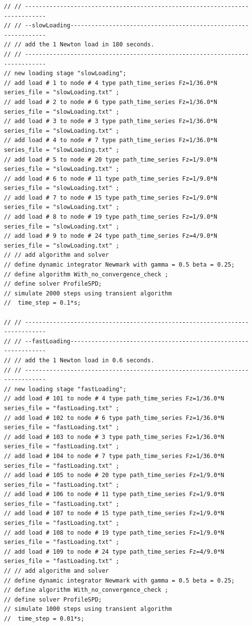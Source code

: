 \documentclass[fleqn,11pt]{article}
\begin{document}
\begin{lstlisting}
// // ----------------------------------------------------------------------------
// // --slowLoading---------------------------------------------------------------
// // add the 1 Newton load in 180 seconds.
// // ----------------------------------------------------------------------------
// new loading stage "slowLoading";
// add load # 1 to node # 4 type path_time_series Fz=1/36.0*N series_file = "slowLoading.txt" ; 
// add load # 2 to node # 6 type path_time_series Fz=1/36.0*N series_file = "slowLoading.txt" ; 
// add load # 3 to node # 3 type path_time_series Fz=1/36.0*N series_file = "slowLoading.txt" ; 
// add load # 4 to node # 7 type path_time_series Fz=1/36.0*N series_file = "slowLoading.txt" ; 
// add load # 5 to node # 20 type path_time_series Fz=1/9.0*N series_file = "slowLoading.txt" ; 
// add load # 6 to node # 11 type path_time_series Fz=1/9.0*N series_file = "slowLoading.txt" ; 
// add load # 7 to node # 15 type path_time_series Fz=1/9.0*N series_file = "slowLoading.txt" ; 
// add load # 8 to node # 19 type path_time_series Fz=1/9.0*N series_file = "slowLoading.txt" ; 
// add load # 9 to node # 24 type path_time_series Fz=4/9.0*N series_file = "slowLoading.txt" ; 
// // add algorithm and solver
// define dynamic integrator Newmark with gamma = 0.5 beta = 0.25;
// define algorithm With_no_convergence_check ;
// define solver ProfileSPD;
// simulate 2000 steps using transient algorithm 
//  time_step = 0.1*s;

// // ----------------------------------------------------------------------------
// // --fastLoading---------------------------------------------------------------
// // add the 1 Newton load in 0.6 seconds.
// // ----------------------------------------------------------------------------
// new loading stage "fastLoading";
// add load # 101 to node # 4 type path_time_series Fz=1/36.0*N series_file = "fastLoading.txt" ; 
// add load # 102 to node # 6 type path_time_series Fz=1/36.0*N series_file = "fastLoading.txt" ; 
// add load # 103 to node # 3 type path_time_series Fz=1/36.0*N series_file = "fastLoading.txt" ; 
// add load # 104 to node # 7 type path_time_series Fz=1/36.0*N series_file = "fastLoading.txt" ; 
// add load # 105 to node # 20 type path_time_series Fz=1/9.0*N series_file = "fastLoading.txt" ; 
// add load # 106 to node # 11 type path_time_series Fz=1/9.0*N series_file = "fastLoading.txt" ; 
// add load # 107 to node # 15 type path_time_series Fz=1/9.0*N series_file = "fastLoading.txt" ; 
// add load # 108 to node # 19 type path_time_series Fz=1/9.0*N series_file = "fastLoading.txt" ; 
// add load # 109 to node # 24 type path_time_series Fz=4/9.0*N series_file = "fastLoading.txt" ; 
// // add algorithm and solver
// define dynamic integrator Newmark with gamma = 0.5 beta = 0.25;
// define algorithm With_no_convergence_check ;
// define solver ProfileSPD;
// simulate 1000 steps using transient algorithm 
//  time_step = 0.01*s;


\end{lstlisting}
\end{document}

